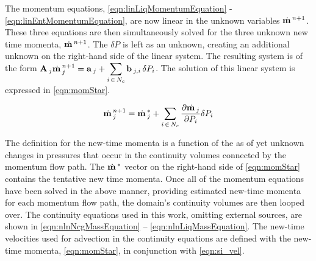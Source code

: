 The momentum equations, \eqref{eqn:linLiqMomentumEquation} - \eqref{eqn:linEntMomentumEquation}, are now linear in the unknown variables $\momVec{}^{n+1}$.
These three equations are then simultaneously solved for the three unknown new time momenta, $\momVec{}^{n+1}$.
The $\delta P$ is left as an unknown, creating an additional unknown on the right-hand side of the linear system.
The resulting system is of the form $\displaystyle \vec{A}_{j} \momVec{}_{j}^{n+1} = \vec{a}_{j} + \sum_{i\, \in \, N_{c}} \vec{b}_{j, i}\, \delta P_{i}$.
The solution of this linear system is expressed in \eqref{eqn:momStar}.

\begin{equation}
\label{eqn:momStar}
\momVec{}_{j}^{n+1} = \momVec{}^{*}_{j} + \sum_{i\, \in \, N_{c}} \frac{\partial \momVec{}_{j}}{\partial P_{i}} \delta P_{i}
\end{equation}

The definition for the new-time momenta is a function of the as of yet unknown changes in pressures that occur in the continuity volumes connected by the momentum flow path.
The $\momVec{}^{*}$ vector on the right-hand side of \eqref{eqn:momStar} contains the tentative new time momenta.
Once all of the momentum equations have been solved in the above manner, providing estimated new-time momenta for each momentum flow path, the domain's continuity volumes are then looped over.
The continuity equations used in this work, omitting external sources, are shown in \eqref{eqn:nlnNcgMassEquation} -- \eqref{eqn:nlnLiqMassEquation}. 
The new-time velocities used for advection in the continuity equations are defined with the new-time momenta, \eqref{eqn:momStar}, in conjunction with \eqref{eqn:si_vel}.

